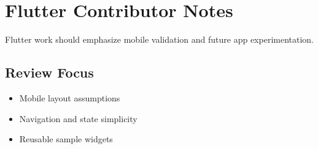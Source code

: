 \section{Flutter Contributor Notes}

Flutter work should emphasize mobile validation and future app experimentation.

\subsection{Review Focus}
\begin{itemize}
  \item Mobile layout assumptions
  \item Navigation and state simplicity
  \item Reusable sample widgets
\end{itemize}
